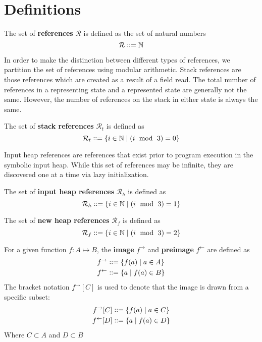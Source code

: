 \section{Definitions}
\label{sec:defs}
\begin{definition}
The set of \textbf{references} $\mathcal{R}$ is defined as the set of natural numbers
 $$\mathcal{R} \vcentcolon \vcentcolon={} \mathbb{N}$$
\end{definition}

In order to make the distinction between different types of references, we partition the set of references using modular arithmetic. Stack references are those references which are created as a result of a field read. The total number of references in a representing state and a represented state are generally not the same. However, the number of references on the stack in either state is always the same. 

\begin{definition}
The set of \textbf{stack references} $\mathcal{R}_t$ is defined as
 $$\mathcal{R}_t \vcentcolon \vcentcolon={}\{i \in \mathbb{N} \mid ( i\ \bmod\ 3 ) = 0\}$$
\end{definition}

Input heap references are references that exist prior to program execution in the symbolic input heap. While this set of references may be infinite, they are discovered one at a time via lazy initialization.

\begin{definition}
The set of \textbf{input heap references} $\mathcal{R}_h$ is defined as
 $$\mathcal{R}_h \vcentcolon \vcentcolon={}\{i \in \mathbb{N} \mid ( i\ \bmod\ 3 ) = 1\}$$
\end{definition}

\begin{definition}
The set of \textbf{new heap references} $\mathcal{R}_f$ is defined as
 $$\mathcal{R}_f \vcentcolon \vcentcolon={}\{i \in \mathbb{N} \mid ( i\ \bmod\ 3 ) = 2\}$$ 
\end{definition}

\begin{definition}
For a given function $f:A \mapsto B$, the \textbf{image} $f^\rightarrow$ and \textbf{preimage} $f^\leftarrow$ are defined as
\begin{align}
 f^\rightarrow &\vcentcolon \vcentcolon={} \{ f(a) \mid a \in A\}\\
 f^\leftarrow &\vcentcolon \vcentcolon={} \{ a \mid f(a) \in B \}
 \end{align}
 The bracket notation $ f^\rightarrow [C] $ is used to denote that the image is drawn from a specific subset:
 \begin{align}
 f^\rightarrow [C] &\vcentcolon \vcentcolon={} \{ f(a) \mid a \in C\}\\
 f^\leftarrow [D] &\vcentcolon \vcentcolon={} \{ a \mid f(a) \in D \}
 \end{align}
 Where $C \subset A$ and $D \subset B$
\end{definition}

